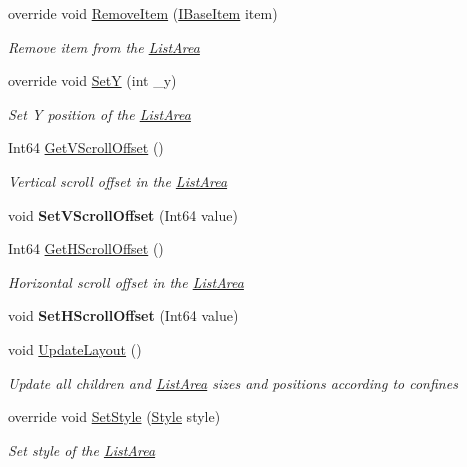 \begin{DoxyCompactItemize}
override void \mbox{\hyperlink{class_space_v_i_l_1_1_list_area_a0020756686088a62a43388973fa2d7bf}{Remove\+Item}} (\mbox{\hyperlink{interface_space_v_i_l_1_1_core_1_1_i_base_item}{I\+Base\+Item}} item)
\begin{DoxyCompactList}\small\item\em Remove item from the \mbox{\hyperlink{class_space_v_i_l_1_1_list_area}{List\+Area}} \end{DoxyCompactList}\item 
override void \mbox{\hyperlink{class_space_v_i_l_1_1_list_area_a0c0974eca2621188c88ba752a5f62a1a}{SetY}} (int \+\_\+y)
\begin{DoxyCompactList}\small\item\em Set Y position of the \mbox{\hyperlink{class_space_v_i_l_1_1_list_area}{List\+Area}} \end{DoxyCompactList}\item 
Int64 \mbox{\hyperlink{class_space_v_i_l_1_1_list_area_aa7af82dde87cb38962fcf14378ebe39f}{Get\+V\+Scroll\+Offset}} ()
\begin{DoxyCompactList}\small\item\em Vertical scroll offset in the \mbox{\hyperlink{class_space_v_i_l_1_1_list_area}{List\+Area}} \end{DoxyCompactList}\item 
\mbox{\label{class_space_v_i_l_1_1_list_area_aefc3de6f9419d56cdd7c00c3da7c135c}} 
void {\bfseries Set\+V\+Scroll\+Offset} (Int64 value)
\item 
Int64 \mbox{\hyperlink{class_space_v_i_l_1_1_list_area_afa9d172433e60b22c5220c06acff38fd}{Get\+H\+Scroll\+Offset}} ()
\begin{DoxyCompactList}\small\item\em Horizontal scroll offset in the \mbox{\hyperlink{class_space_v_i_l_1_1_list_area}{List\+Area}} \end{DoxyCompactList}\item 
\mbox{\label{class_space_v_i_l_1_1_list_area_a6af19a0f18ea5a2d28f2ad17605d155a}} 
void {\bfseries Set\+H\+Scroll\+Offset} (Int64 value)
\item 
void \mbox{\hyperlink{class_space_v_i_l_1_1_list_area_af0fb95222910f6e85274a38dfa506174}{Update\+Layout}} ()
\begin{DoxyCompactList}\small\item\em Update all children and \mbox{\hyperlink{class_space_v_i_l_1_1_list_area}{List\+Area}} sizes and positions according to confines \end{DoxyCompactList}\item 
override void \mbox{\hyperlink{class_space_v_i_l_1_1_list_area_a04902026e7956980b7dce5bff22d082c}{Set\+Style}} (\mbox{\hyperlink{class_space_v_i_l_1_1_decorations_1_1_style}{Style}} style)
\begin{DoxyCompactList}\small\item\em Set style of the \mbox{\hyperlink{class_space_v_i_l_1_1_list_area}{List\+Area}} \end{DoxyCompactList}\end{DoxyCompactItemize}
